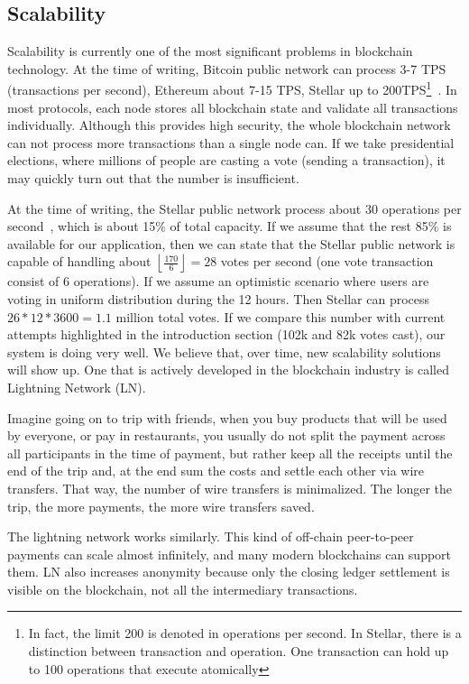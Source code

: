 \documentclass[applsci,article,submit,moreauthors,pdftex]{Definitions/mdpi}
\newcommand{\floor}[1]{\left\lfloor #1 \right\rfloor}
\begin{document}
\subsection{Scalability}
Scalability is currently one of the most significant problems in blockchain technology. At the time of writing, Bitcoin public network can process 3-7 TPS (transactions per second), Ethereum about 7-15 TPS, Stellar up to 200TPS\footnote{In fact, the limit 200 is denoted in operations per second. In Stellar, there is a distinction between transaction and operation. One transaction can hold up to 100 operations 
that execute atomically}~\cite{Protocol19:online}. 
In most protocols, each node stores all blockchain state and validate all transactions individually. Although this provides high security, the whole blockchain network can not process more transactions than a single node can. If we take presidential elections, where millions of people are casting a vote (sending a transaction), it may quickly turn out that the number is insufficient.

At the time of writing, the Stellar public network process about 30 operations per second~\cite{StellarN45:online}, which is about 15\% of total capacity. If we assume that the rest 85\% is available for our application, then we can state that the Stellar public network is capable of handling about $\floor{\frac{170}{6}} = 28$ votes per second (one vote transaction consist of 6 operations). If we assume an optimistic scenario where users are voting in uniform distribution during the 12 hours. Then Stellar can process $26 * 12 * 3600 = 1.1$ million total votes. If we compare this number with current attempts highlighted in the introduction section (102k and 82k votes cast), our system is doing very well. 
We believe that, over time, new scalability solutions will show up. One that is actively developed in the blockchain industry is called Lightning Network (LN).

Imagine going on to trip with friends, when you buy products that will be used by everyone, or pay in restaurants, you usually do not split the payment across all participants in the time of payment, but rather keep all the receipts until the end of the trip and, at the end sum the costs and settle each other via wire transfers. That way, the number of wire transfers is minimalized. The longer the trip, the more payments, the more wire transfers saved.

The lightning network works similarly. This kind of off-chain peer-to-peer payments can scale almost infinitely, and many modern blockchains can support them. LN also increases anonymity because only the closing ledger settlement is visible on the blockchain, not all the intermediary transactions. 
\end{document}
